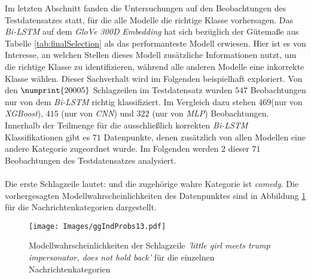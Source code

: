 \documentclass[a4paper,11pt]{article}
\begin{document}
Im letzten Abschnitt fanden die Untersuchungen auf den Beobachtungen des Testdatensatzes statt, für die alle Modelle die richtige Klasse vorhersagen. Das \textit{Bi-LSTM} auf dem \textit{GloVe 300D} \textit{Embedding} hat sich bezüglich der Gütemaße aus Tabelle \ref{tab:finalSelection} als das performanteste Modell erwiesen. Hier ist es von Interesse, an welchen Stellen dieses Modell zusätzliche Informationen nutzt, um die richtige Klasse zu identifizieren, während alle anderen Modelle eine inkorrekte Klasse wählen. Dieser Sachverhalt wird im Folgenden beispielhaft exploriert. Von den $\numprint{20005}$ Schlagzeilen im Testdatensatz wurden $547$ Beobachtungen nur von dem \textit{Bi-LSTM} richtig klassifiziert. Im Vergleich dazu stehen $469$(nur von \textit{XGBoost}), $415$ (nur von \textit{CNN}) und $322$ (nur von \textit{MLP}) Beobachtungen. Innerhalb der Teilmenge für die ausschließlich korrekten \textit{Bi-LSTM} Klassifikationen gibt es $71$ Datenpunkte, denen zusätzlich von allen Modellen eine andere Kategorie zugeordnet wurde. Im Folgenden werden $2$ dieser $71$ Beobachtungen des Testdatensatzes analysiert. \\
\\
Die erste Schlagzeile lautet:  und die zugehörige wahre Kategorie ist \textit{comedy}. Die vorhergesagten Modellwahrscheinlichkeiten des Datenpunktes sind in Abbildung \ref{abb:IndProbs13}  für die Nachrichtenkategorien dargestellt.

\begin{figure}[H]
    \centering
\texttt{[image: Images/ggIndProbs13.pdf]} 
\caption{Modellwahrscheinlichkeiten der Schlagzeile \textit{'little girl meets trump impersonator, does not hold back'} für die einzelnen Nachrichtenkategorien}
\label{abb:IndProbs13}
\end{figure}
\end{document}
